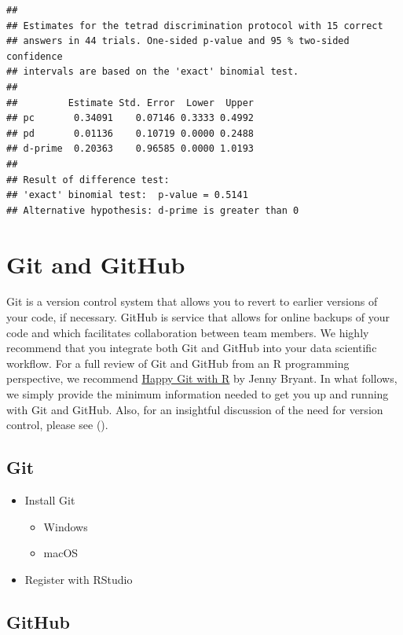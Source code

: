 \documentclass[
]{book}
\providecommand{\tightlist}{%
  \setlength{\itemsep}{0pt}\setlength{\parskip}{0pt}}
\begin{document}
\begin{verbatim}
## 
## Estimates for the tetrad discrimination protocol with 15 correct
## answers in 44 trials. One-sided p-value and 95 % two-sided confidence
## intervals are based on the 'exact' binomial test. 
## 
##         Estimate Std. Error  Lower  Upper
## pc       0.34091    0.07146 0.3333 0.4992
## pd       0.01136    0.10719 0.0000 0.2488
## d-prime  0.20363    0.96585 0.0000 1.0193
## 
## Result of difference test:
## 'exact' binomial test:  p-value = 0.5141 
## Alternative hypothesis: d-prime is greater than 0
\end{verbatim}

\hypertarget{git-and-github}{%
\section{Git and GitHub}\label{git-and-github}}

Git is a version control system that allows you to revert to earlier versions of your code, if necessary. GitHub is service that allows for online backups of your code and which facilitates collaboration between team members. We highly recommend that you integrate both Git and GitHub into your data scientific workflow. For a full review of Git and GitHub from an R programming perspective, we recommend \href{https://happygitwithr.com/}{Happy Git with R} by Jenny Bryant. In what follows, we simply provide the minimum information needed to get you up and running with Git and GitHub. Also, for an insightful discussion of the need for version control, please see (\citet{bryan2018excuse}).

\hypertarget{git}{%
\subsection{Git}\label{git}}

\begin{itemize}
\tightlist
\item
  Install Git

  \begin{itemize}
  \tightlist
  \item
    Windows
  \item
    macOS
  \end{itemize}
\item
  Register with RStudio
\end{itemize}

\hypertarget{github}{%
\subsection{GitHub}\label{github}}
\end{document}
